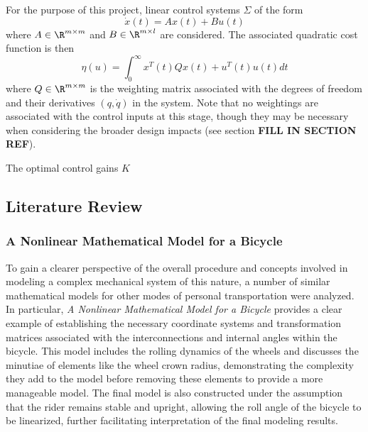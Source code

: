 For the purpose of this project, linear control systems $\Sigma$ of the form
\begin{equation}
\dot{x}(t) = Ax(t) + Bu(t)
\end{equation}
where $A \in \R^{m \times m}$ and $B \in \R^{m \times l}$ are considered.
The associated quadratic cost function is then 
\begin{equation}
\eta(u) = \int_{0}^{\infty}x^{T}(t)Qx(t)+u^{T}(t)u(t)dt
\end{equation}
where $Q \in \R^{m \times m}$ is the weighting matrix associated with the degrees of freedom and their derivatives $(q, \dot{q})$ in the system. Note that no weightings are associated with the control inputs at this stage, though they may be necessary when considering the broader design impacts (see section \textbf{FILL IN SECTION REF}).

The optimal control gains $K$ 

\subsection{Literature Review}
\subsubsection{A Nonlinear Mathematical Model for a Bicycle}
To gain a clearer perspective of the overall procedure and concepts involved in modeling a complex mechanical system of this nature, a number of similar mathematical models for other modes of personal transportation were analyzed.
In particular, \textit{A Nonlinear Mathematical Model for a Bicycle} \cite{bicycle} provides a clear example of establishing the necessary coordinate systems and transformation matrices associated with the interconnections and internal angles within the bicycle.
This model includes the rolling dynamics of the wheels and discusses the minutiae of elements like the wheel crown radius, demonstrating the complexity they add to the model before removing these elements to provide a more manageable model.
The final model is also constructed under the assumption that the rider remains stable and upright, allowing the roll angle of the bicycle to be linearized, further facilitating interpretation of the final modeling results. 

